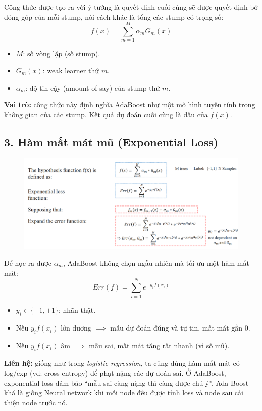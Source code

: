 \documentclass[11pt]{article}
\begin{document}
Công thức được tạo ra với ý tưởng là quyết định cuối cùng sẽ được quyết định bở đóng góp của mỗi stump, nói cách khác là tổng các stump có trọng số:
\[
f(x) = \sum_{m=1}^M \alpha_m G_m(x)
\]

\begin{itemize}
    \item \(M\): số vòng lặp (số stump).
    \item \(G_m(x)\): weak learner thứ \(m\).
    \item \(\alpha_m\): độ tin cậy (amount of say) của stump thứ \(m\).
\end{itemize}

\textbf{Vai trò:} công thức này định nghĩa AdaBoost như một mô hình tuyến tính trong không gian của các stump. Kết quả dự đoán cuối cùng là dấu của \(f(x)\).



\subsection*{3. Hàm mất mát mũ (Exponential Loss)}

    \begin{figure}[H]
    \centering
    \includegraphics[width=0.7\linewidth]{images/math3.png}
    \end{figure}
Để học ra được \(\alpha_m\), AdaBoost không chọn ngẫu nhiên mà tối ưu một hàm mất mát:
\[
Err(f) = \sum_{i=1}^N e^{-y_i f(x_i)}
\]

\begin{itemize}
    \item \(y_i \in \{-1, +1\}\): nhãn thật.  
    \item Nếu \(y_i f(x_i)\) lớn dương \(\implies\) mẫu dự đoán đúng và tự tin, mất mát gần 0.  
    \item Nếu \(y_i f(x_i)\) âm \(\implies\) mẫu sai, mất mát tăng rất nhanh (vì số mũ).
\end{itemize}

\textbf{Liên hệ:} giống như trong \textit{logistic regression}, ta cũng dùng hàm mất mát có log/exp (vd: cross-entropy) để phạt nặng các dự đoán sai. Ở AdaBoost, exponential loss đảm bảo “mẫu sai càng nặng thì càng được chú ý”. Ada Boost khá là giống Neural network khi mỗi node đều được tính loss và node sau cải thiện node trước nó.
\end{document}
